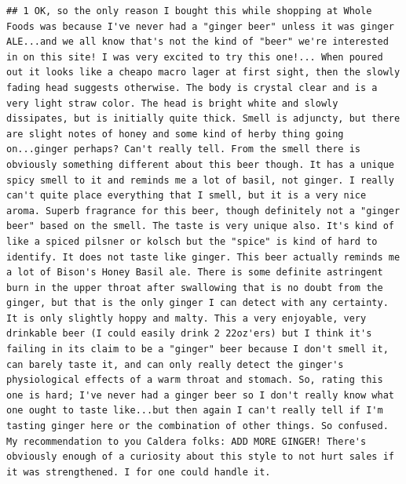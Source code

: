\documentclass[
  a4paper,
]{article}
\begin{document}
\begin{verbatim}
## 1 OK, so the only reason I bought this while shopping at Whole Foods was because I've never had a "ginger beer" unless it was ginger ALE...and we all know that's not the kind of "beer" we're interested in on this site! I was very excited to try this one!... When poured out it looks like a cheapo macro lager at first sight, then the slowly fading head suggests otherwise. The body is crystal clear and is a very light straw color. The head is bright white and slowly dissipates, but is initially quite thick. Smell is adjuncty, but there are slight notes of honey and some kind of herby thing going on...ginger perhaps? Can't really tell. From the smell there is obviously something different about this beer though. It has a unique spicy smell to it and reminds me a lot of basil, not ginger. I really can't quite place everything that I smell, but it is a very nice aroma. Superb fragrance for this beer, though definitely not a "ginger beer" based on the smell. The taste is very unique also. It's kind of like a spiced pilsner or kolsch but the "spice" is kind of hard to identify. It does not taste like ginger. This beer actually reminds me a lot of Bison's Honey Basil ale. There is some definite astringent burn in the upper throat after swallowing that is no doubt from the ginger, but that is the only ginger I can detect with any certainty. It is only slightly hoppy and malty. This a very enjoyable, very drinkable beer (I could easily drink 2 22oz'ers) but I think it's failing in its claim to be a "ginger" beer because I don't smell it, can barely taste it, and can only really detect the ginger's physiological effects of a warm throat and stomach. So, rating this one is hard; I've never had a ginger beer so I don't really know what one ought to taste like...but then again I can't really tell if I'm tasting ginger here or the combination of other things. So confused. My recommendation to you Caldera folks: ADD MORE GINGER! There's obviously enough of a curiosity about this style to not hurt sales if it was strengthened. I for one could handle it.

\end{verbatim}
\end{document}
